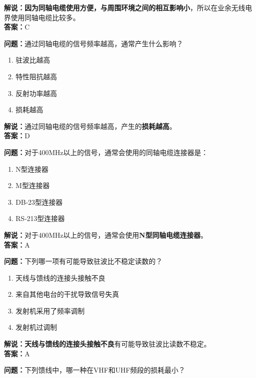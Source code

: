 \textbf{解说：}\textbf{因为同轴电缆使用方便，与周围环境之间的相互影响小}，所以在业余无线电界使用同轴电缆比较多。\\\textbf{答案：}C



\textbf{问题：}通过同轴电缆的信号频率越高，通常产生什么影响？

\begin{enumerate}[label=\Alph*), leftmargin=1.5cm]
	\item 驻波比越高
	\item 特性阻抗越高
	\item 反射功率越高
	\item 损耗越高
\end{enumerate}

\textbf{解说：}通过同轴电缆的信号频率越高，产生的\textbf{损耗越高}。\\\textbf{答案：}D



\textbf{问题：}对于400MHz以上的信号，通常会使用的同轴电缆连接器是：

\begin{enumerate}[label=\Alph*), leftmargin=1.5cm]
	\item N型连接器
	\item M型连接器
	\item DB-23型连接器
	\item RS-213型连接器
\end{enumerate}

\textbf{解说：}对于400MHz以上的信号，通常会使用\textbf{N型同轴电缆连接器}。\\\textbf{答案：}A



\textbf{问题：}下列哪一项有可能导致驻波比不稳定读数的？

\begin{enumerate}[label=\Alph*), leftmargin=1.5cm]
	\item 天线与馈线的连接头接触不良
	\item 来自其他电台的干扰导致信号失真
	\item 发射机采用了频率调制
	\item 发射机过调制
\end{enumerate}

\textbf{解说：}\textbf{天线与馈线的连接头接触不良}有可能导致驻波比读数不稳定。\\\textbf{答案：}A



\textbf{问题：}下列馈线中，哪一种在VHF和UHF频段的损耗最小？

